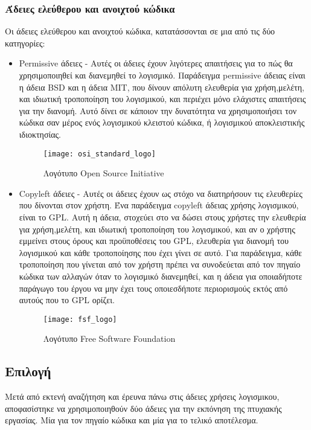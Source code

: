 \subsubsection{Άδειες ελεύθερου και ανοιχτού κώδικα}
Οι άδειες ελεύθερου και ανοιχτού κώδικα, κατατάσσονται σε μια από τις δύο κατηγορίες: 
\begin{itemize}
\item Permissive άδειες - Αυτές οι άδειες έχουν λιγότερες απαιτήσεις για το πώς θα χρησιμοποιηθεί και διανεμηθεί το λογισμικό. Παράδειγμα permissive άδειας είναι η άδεια BSD και η άδεια MIT, που δίνουν απόλυτη ελευθερία για χρήση,μελέτη, και ιδιωτική τροποποίηση του λογισμικού, και περιέχει μόνο ελάχιστες απαιτήσεις για την διανομή. Αυτό δίνει σε κάποιον την δυνατότητα να χρησιμοποιήσει τον κώδικα σαν μέρος ενός λογισμικού κλειστού κώδικα, ή λογισμικού αποκλειστικής ιδιοκτησίας.
\begin{figure}[h]
	\centering
	\texttt{[image: osi\_standard\_logo]}
	\caption{Λογότυπο Open Source Initiative}
\end{figure}
\item Copyleft άδειες - Αυτές οι άδειες έχουν ως στόχο να διατηρήσουν τις ελευθερίες που δίνονται στον χρήστη. Ένα παράδειγμα copyleft άδειας χρήσης λογισμικού, είναι το GPL. Αυτή η άδεια, στοχεύει στο να δώσει στους χρήστες την ελευθερία για χρήση,μελέτη, και ιδιωτική τροποποίηση του λογισμικού, και αν ο χρήστης εμμείνει στους όρους και προϋποθέσεις του GPL, ελευθερία για διανομή του λογισμικού και κάθε τροποποίησης που έχει γίνει σε αυτό. Για παράδειγμα, κάθε τροποποίηση που γίνεται από τον χρήστη πρέπει να συνοδεύεται από τον πηγαίο κώδικα των αλλαγών όταν το λογισμικό διανεμηθεί, και η άδεια για οποιαδήποτε παράγωγο του έργου να μην έχει τους οποιεσδήποτε περιορισμούς εκτός από αυτούς που το GPL ορίζει.
\begin{figure}[h]
	\centering
	\texttt{[image: fsf\_logo]}
	\caption{Λογότυπο Free Software Foundation}
\end{figure}
\end{itemize}

\subsection{Επιλογή}
Μετά από εκτενή αναζήτηση και έρευνα πάνω στις άδειες χρήσεις λογισμικου, αποφασίστηκε να χρησιμοποιηθούν δύο άδειες για την εκπόνηση της πτυχιακής εργασίας. Μία για τον πηγαίο κώδικα και μία για το τελικό αποτέλεσμα. 
